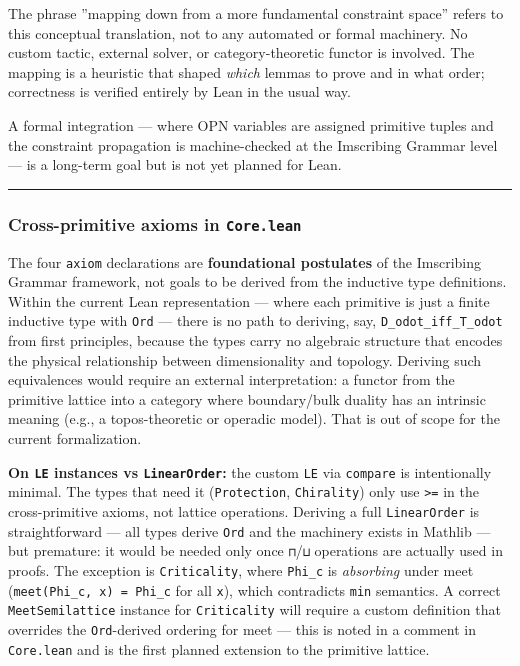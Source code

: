 \documentclass[12pt,a4paper]{article}
\begin{document}
The phrase ''mapping down from a more fundamental constraint space'' refers to this conceptual
translation, not to any automated or formal machinery. No custom tactic, external solver, or
category-theoretic functor is involved. The mapping is a heuristic that shaped \emph{which} lemmas
to prove and in what order; correctness is verified entirely by Lean in the usual way.

A formal integration --- where OPN variables are assigned primitive tuples and the constraint
propagation is machine-checked at the Imscribing Grammar level --- is a long-term goal but is not yet
planned for Lean.

\begin{center}
\rule{0.5\textwidth}{0.4pt}
\end{center}

\subsubsection{Cross-primitive axioms in \texttt{Core.lean}}

The four \texttt{axiom} declarations are \textbf{foundational postulates} of the Imscribing Grammar framework,
not goals to be derived from the inductive type definitions. Within the current Lean
representation --- where each primitive is just a finite inductive type with \texttt{Ord} --- there is
no path to deriving, say, \texttt{D\_odot\_iff\_T\_odot} from first principles, because the types carry
no algebraic structure that encodes the physical relationship between dimensionality and topology.
Deriving such equivalences would require an external interpretation: a functor from the primitive
lattice into a category where boundary/bulk duality has an intrinsic meaning (e.g., a
topos-theoretic or operadic model). That is out of scope for the current formalization.

\textbf{On \texttt{LE} instances vs \texttt{LinearOrder}:} the custom \texttt{LE} via \texttt{compare} is intentionally minimal.
The types that need it (\texttt{Protection}, \texttt{Chirality}) only use \texttt{\textgreater{}=} in the cross-primitive axioms,
not lattice operations. Deriving a full \texttt{LinearOrder} is straightforward --- all types derive \texttt{Ord}
and the machinery exists in Mathlib --- but premature: it would be needed only once \texttt{⊓}/\texttt{⊔}
operations are actually used in proofs. The exception is \texttt{Criticality}, where \texttt{Phi\_c} is
\emph{absorbing} under meet (\texttt{meet(Phi\_c, x) = Phi\_c} for all \texttt{x}), which contradicts \texttt{min} semantics.
A correct \texttt{MeetSemilattice} instance for \texttt{Criticality} will require a custom definition that
overrides the \texttt{Ord}-derived ordering for meet --- this is noted in a comment in \texttt{Core.lean} and
is the first planned extension to the primitive lattice.
\end{document}
